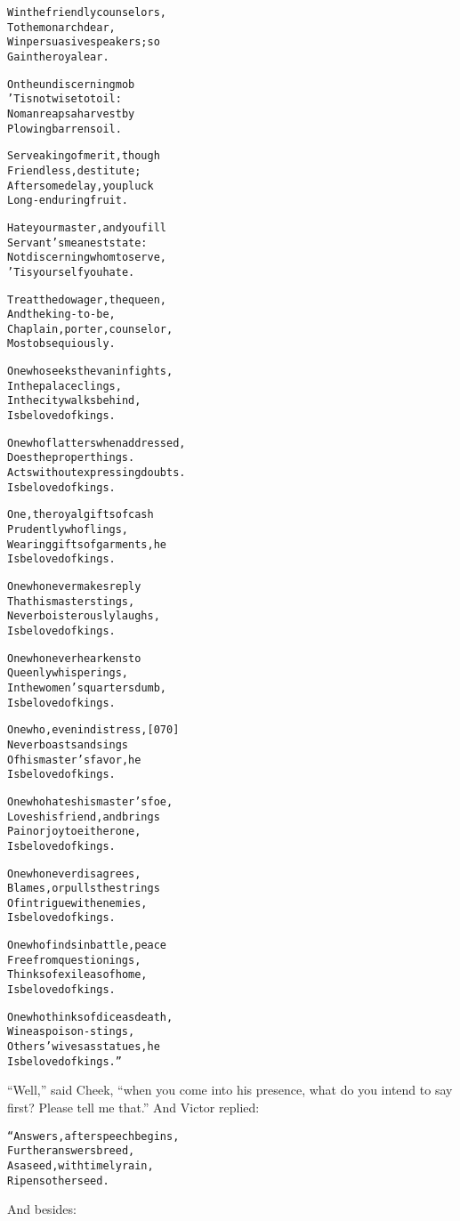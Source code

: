\documentclass{article}
\renewenvironment{verbatim}{\begin{alltt}\normalfont\begin{centering}}{\end{centering}\end{alltt}}
\begin{document}
\begin{verbatim}
Win the friendly counselors,
    To the monarch dear,
Win persuasive speakers; so
    Gain the royal ear.

On the undiscerning mob
    'Tis not wise to toil:
No man reaps a harvest by
    Plowing barren soil.

Serve a king of merit, though
    Friendless, destitute;
After some delay, you pluck
    Long-enduring fruit.

Hate your master, and you fill
    Servant's meanest state:
Not discerning whom to serve,
    'Tis yourself you hate.

Treat the dowager, the queen,
    And the king-to-be,
Chaplain, porter, counselor,
    Most obsequiously.

One who seeks the van in fights,
    In the palace clings,
In the city walks behind,
    Is beloved of kings.

One who flatters when addressed,
    Does the proper things.
Acts without expressing doubts.
    Is beloved of kings.

One, the royal gifts of cash
    Prudently who flings,
Wearing gifts of garments, he
    Is beloved of kings.

One who never makes reply
    That his master stings,
Never boisterously laughs,
    Is beloved of kings.

One who never hearkens to
    Queenly whisperings,
In the women's quarters dumb,
    Is beloved of kings.

One who, even in distress,                              [070]
    Never boasts and sings
Of his master's favor, he
    Is beloved of kings.

One who hates his master's foe,
    Loves his friend, and brings
Pain or joy to either one,
    Is beloved of kings.

One who never disagrees,
    Blames, or pulls the strings
Of intrigue with enemies,
    Is beloved of kings.

One who finds in battle, peace
    Free from questionings,
Thinks of exile as of home,
    Is beloved of kings.

One who thinks of dice as death,
    Wine as poison-stings,
Others' wives as statues, he
    Is beloved of kings.”
\end{verbatim}
``Well,'' said Cheek,
``when you come into his presence, what do you intend to say first? Please tell me that.''
And Victor replied:

\begin{verbatim}
“Answers, after speech begins,
    Further answers breed,
As a seed, with timely rain,
    Ripens other seed.
\end{verbatim}
And besides:
\end{document}
